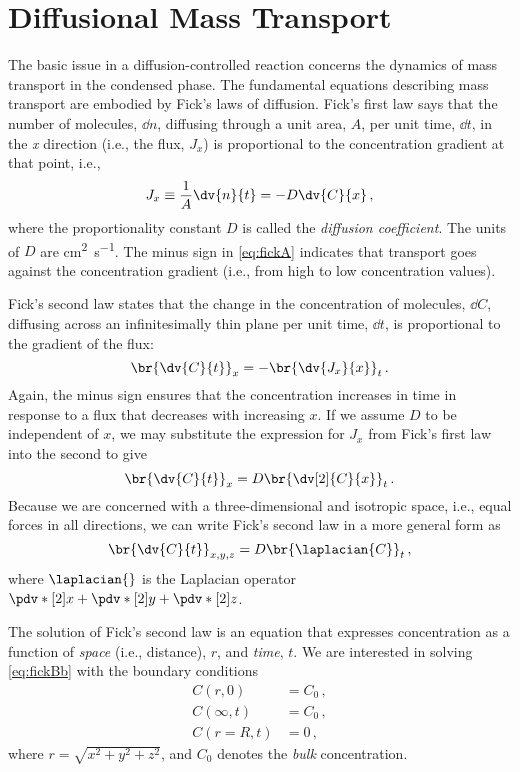 \section{Diffusional Mass Transport} %
\label{sec:mass_trans}
The basic issue in a diffusion-controlled reaction concerns the dynamics of mass transport in the condensed phase. 
The fundamental equations describing mass transport are embodied by Fick's laws of diffusion. 
Fick's first law says that the number of molecules, \( \dd{n} \), diffusing through a unit area, \( A \), per unit time, \( \dd{t} \), in the \emph{x} direction (i.e., the flux, \( J_x \)) is proportional to the concentration gradient at that point, i.e.,
\begin{equation}
	J_x \equiv \frac{1}{A}\dv{n}{t} = -D \dv{C}{x} \, ,
	\label{eq:fickA}
\end{equation}
where the proportionality constant \( D \) is called the \emph{diffusion coefficient}. 
The units of \( D \) are \si{\cm\squared \per \s}. 
The minus sign in \cref{eq:fickA} indicates that transport goes against the concentration gradient
(i.e., from high to low concentration values).

Fick's second law states that the change in the concentration of molecules, \( \dd{C} \), diffusing
across an infinitesimally thin plane per unit time, \( \dd{t} \), is proportional to the gradient of the flux:
\begin{equation}
	\br{\dv{C}{t}}_x = - \br{\dv{J_x}{x}}_t \, .
\end{equation}
Again, the minus sign ensures that the concentration increases in time in response to a flux that decreases with increasing \( x \).
If we assume \( D \) to be independent of \( x \), we may substitute the expression for \( J_x \) from Fick's first law into the second to give
\begin{equation}
	\br{\dv{C}{t}}_x = D \br{\dv[2]{C}{x}}_t \, .
	\label{eq:fickBa}
\end{equation}
Because we are concerned with a three-dimensional and isotropic space, i.e., equal forces in all directions, we can write Fick's second law in a more general form as 
\begin{equation}
	\br{\dv{C}{t}}_{x, y, z} = D \br{\laplacian{C}}_t \, ,
	\label{eq:fickBb}
\end{equation}
where \( \laplacian{} \) is the Laplacian operator \( \pdv*[2]{x} + \pdv*[2]{y} + \pdv*[2]{z} \).

The solution of Fick's second law is an equation that expresses concentration as a function of \emph{space} (i.e., distance), \( r \), and \emph{time}, \( t \). 
We are interested in solving \cref{eq:fickBb} with the boundary conditions 
\begin{align*}
	C(r, 0) 		&= C_0 \, , \\
	C(\infty, t) 	&= C_0 \, , \\
	C(r=R, t) 	&= 0 \, ,
\end{align*}
where \( r = \sqrt{x^2 + y^2 + z^2} \), and \( C_0 \) denotes the \emph{bulk} concentration. 

